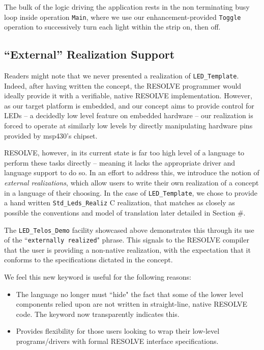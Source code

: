 \documentclass{sig-alternate}
\begin{document}
The bulk of the logic driving the application rests in the non terminating busy loop inside operation \texttt{Main}, where we use our enhancement-provided \texttt{Toggle} operation to successively turn each light within the strip on, then off.

\subsection{``External'' Realization Support}
\label{ssec:external}

Readers might note that we never presented a realization of \texttt{LED\_Template}. Indeed, after having written the concept, the RESOLVE programmer would ideally provide it with a verifiable, native RESOLVE implementation. However, as our target platform is embedded, and our concept aims to provide control for LEDs -- a decidedly low level feature on embedded hardware -- our realization is forced to operate at similarly low levels by directly manipulating hardware pins provided by msp430's chipset. 

RESOLVE, however, in its current state is far too high level of a language to perform these tasks directly -- meaning it lacks the appropriate driver and language support to do so. In an effort to address this, we introduce the notion of \textit{external realizations}, which allow users to write their own realization of a concept in a language of their choosing. In the case of \texttt{LED\_Template}, we chose to provide a hand written \texttt{Std\_Leds\_Realiz} C realization, that matches as closely as possible the conventions and model of translation later detailed in Section \#. 

The \texttt{LED\_Telos\_Demo} facility showcased above demonstrates this through its use of the ``\texttt{externally realized}" phrase. This signals to the RESOLVE compiler that the user is providing a non-native realization, with the expectation that it conforms to the specifications dictated in the concept. 




We feel this new keyword is useful for the following reasons:
\begin{itemize}
\item The language no longer must ``hide" the fact that some of the lower level components relied upon are not written in straight-line, native RESOLVE code. The keyword now transparently indicates this.
\item Provides flexibility for those users looking to wrap their low-level programs/drivers with formal RESOLVE interface specifications.
\end{itemize}
\end{document}
